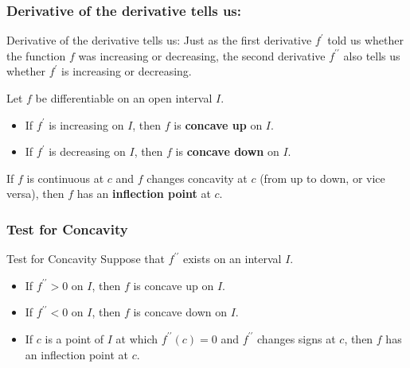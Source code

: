 \documentclass[cal1spr16Lectures.tex]{subfiles}
\begin{document}
\subsubsection{Derivative of the derivative tells us:}

\begin{frame}{\small Derivative of the derivative tells us:}
\small 
Just as the first derivative $f^{\prime}$ told us whether the function $f$ was increasing or decreasing, the second derivative $f^{\prime\prime}$ also tells us whether $f^{\prime}$ is increasing or decreasing.

\begin{dfn} Let $f$ be differentiable on an open interval $I$.
\begin{itemize}
\item If $f^{\prime}$ is increasing on $I$, then $f$ is {\bf concave up} on $I$.
\item If $f^{\prime}$ is decreasing on $I$, then $f$ is {\bf concave down} on $I$.
\end{itemize}
\end{dfn}

\begin{dfn} If $f$ is continuous at $c$ and $f$ changes concavity at $c$ (from up to down, or vice versa), then $f$ has an {\bf inflection point} at $c$. \end{dfn}
\end{frame}

\subsubsection{Test for Concavity}

\begin{frame}{\small Test for Concavity}
Suppose that $f^{\prime\prime}$ exists on an interval $I$.

\begin{itemize}
\item If $f^{\prime\prime}>0$ on $I$, then $f$ is \alert{concave up} on $I$.

\vspace{0.5pc}
\item If $f^{\prime\prime}<0$ on $I$, then $f$ is \alert{concave down} on $I$.

\vspace{0.5pc}
\item If $c$ is a point of $I$ at which $f^{\prime\prime}(c)=0$ and $f^{\prime\prime}$ changes signs at $c$, then $f$ has an \alert{inflection point} at $c$.
\end{itemize}
\end{frame}
\end{document}
